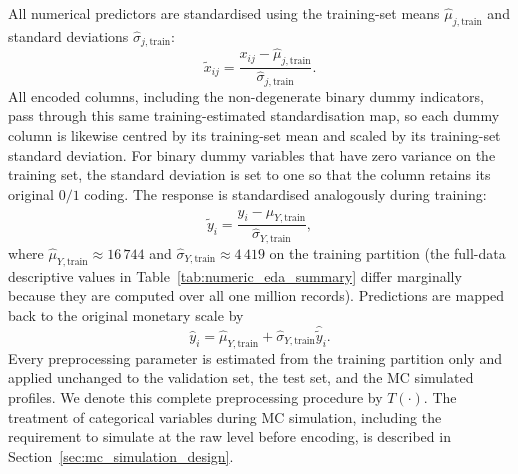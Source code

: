 All numerical predictors are standardised using the training-set means
$\widehat{\mu}_{j,\mathrm{train}}$ and standard deviations
$\widehat{\sigma}_{j,\mathrm{train}}$:
\begin{equation}
    \widetilde{x}_{ij}
    =
    \frac{x_{ij} - \widehat{\mu}_{j,\mathrm{train}}}
    {\widehat{\sigma}_{j,\mathrm{train}}}.
    \label{eq:input_standardisation}
\end{equation}
All encoded columns, including the non-degenerate binary dummy
indicators, pass through this same training-estimated standardisation
map, so each dummy column is likewise centred by its training-set mean
and scaled by its training-set standard deviation.  For binary dummy
variables that have zero variance on the training set,
the standard deviation is set to one so that the column retains its
original $0/1$ coding.  The response is standardised analogously during
training:
\begin{equation}
    \widetilde{y}_{i}
    =
    \frac{y_i - \widehat{\mu}_{Y,\mathrm{train}}}
    {\widehat{\sigma}_{Y,\mathrm{train}}},
    \label{eq:response_standardisation_ch3}
\end{equation}
where $\widehat{\mu}_{Y,\mathrm{train}} \approx 16\,744$ and
$\widehat{\sigma}_{Y,\mathrm{train}} \approx 4\,419$ on the training
partition (the full-data descriptive values in
Table~\ref{tab:numeric_eda_summary} differ marginally because they are
computed over all one million records).  Predictions are
mapped back to the original monetary scale by
\begin{equation}
    \widehat{y}_{i}
    =
    \widehat{\mu}_{Y,\mathrm{train}}
    +
    \widehat{\sigma}_{Y,\mathrm{train}}
    \widehat{\widetilde{y}}_{i}.
    \label{eq:response_denormalisation_ch3}
\end{equation}
Every preprocessing parameter is estimated from the training partition
only and applied unchanged to the validation set, the test set, and the
MC simulated profiles.  We denote this complete preprocessing
procedure by $T(\cdot)$.  The treatment of categorical variables during MC simulation,
including the requirement to simulate at the raw level before encoding,
is described in Section~\ref{sec:mc_simulation_design}.


